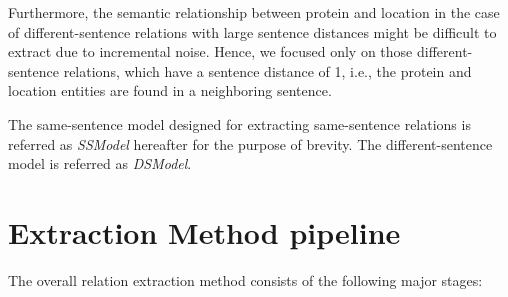 Furthermore, the semantic relationship between protein and location in the case of different-sentence relations with large sentence distances might be difficult to extract due to incremental noise. Hence, we focused only on those different-sentence relations, which have a sentence distance of 1, i.e., the protein and location entities are found in a neighboring sentence.

The same-sentence model designed for extracting same-sentence relations is referred as \textit{SSModel} hereafter for the purpose of brevity. The different-sentence model is referred as \textit{DSModel}.

\section{Extraction Method pipeline}\label{sec:pipeline}


The overall relation extraction method consists of the following major stages:

